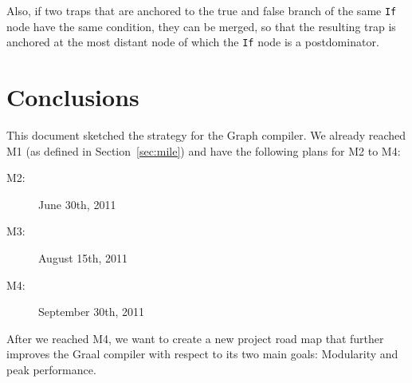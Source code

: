 \documentclass[twocolumn]{svjour3}
\begin{document}
Also, if two traps that are anchored to the true and false branch of the same \texttt{If} node have the same condition, they can be merged, so that the resulting trap is anchored at the most distant node of which the \texttt{If} node is a postdominator.

\section{Conclusions}
This document sketched the strategy for the Graph compiler.
We already reached M1 (as defined in Section~\ref{sec:mile}) and have the following plans for M2 to M4:
\begin{description}
\item[M2:] June 30th, 2011
\item[M3:] August 15th, 2011
\item[M4:] September 30th, 2011
\end{description}
After we reached M4, we want to create a new project road map that further improves the Graal compiler with respect to its two main goals: Modularity and peak performance.
\end{document}
